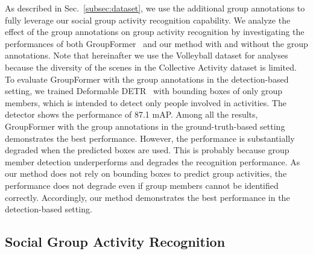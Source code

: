 \documentclass[runningheads]{llncs}
\begin{document}
As described in Sec.~\ref{subsec:dataset}, we use the additional group annotations to fully leverage our social group activity recognition capability. We analyze the effect of the group annotations on group activity recognition by investigating the performances of both GroupFormer~\cite{li_iccv2021} and our method with and without the group annotations. Note that hereinafter we use the Volleyball dataset for analyses because the diversity of the scenes in the Collective Activity dataset is limited. To evaluate GroupFormer with the group annotations in the detection-based setting, we trained Deformable DETR~\cite{zhu_iclr2021} with bounding boxes of only group members, which is intended to detect only people involved in activities. The detector shows the performance of 87.1 mAP.
Among all the results, GroupFormer with the group annotations in the ground-truth-based setting demonstrates the best performance. However, the performance is substantially degraded when the predicted boxes are used. This is probably because group member detection underperforms and degrades the recognition performance. As our method does not rely on bounding boxes to predict group activities, the performance does not degrade even if group members cannot be identified correctly. Accordingly, our method demonstrates the best performance in the detection-based setting.

\subsection{Social Group Activity Recognition}
\end{document}
